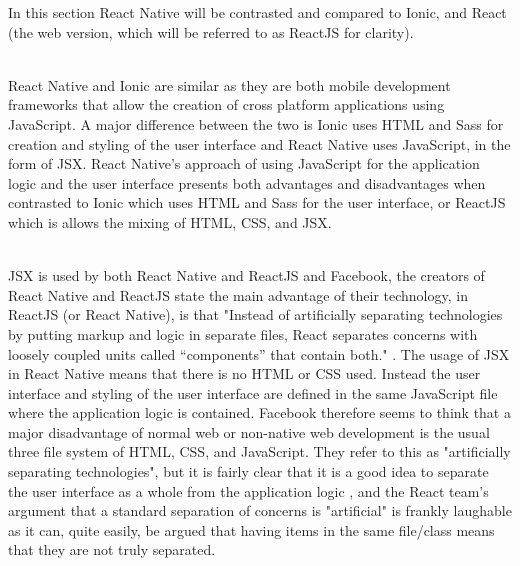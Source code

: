 \documentclass[a4paper, 11pt]{article}
\begin{document}
In this section React Native will be contrasted and compared to Ionic, and React (the web version, which will be referred to as ReactJS for clarity).

~\\
React Native and Ionic are similar as they are both mobile development frameworks that allow the creation of cross platform applications using JavaScript. A major difference between the two is Ionic uses HTML and Sass for creation and styling of the user interface and React Native uses JavaScript, in the form of JSX. React Native's approach of using JavaScript for the application logic and the user interface presents both advantages and disadvantages when contrasted to Ionic which uses HTML and 
Sass for the user interface, or ReactJS which is allows the mixing of HTML, CSS, and JSX.

~\\
JSX is used by both React Native and ReactJS and Facebook, the creators of React Native and ReactJS state the main advantage of their technology, in ReactJS (or React Native), is that "Instead of artificially separating technologies by putting markup and logic in separate files, React separates concerns with loosely coupled units called “components” that contain both." \cite{advantages}. The usage of JSX in React Native means that there is no HTML or CSS used. Instead the user interface and styling of the user interface are defined in the same JavaScript file where the application logic is contained. Facebook therefore seems to think that a major disadvantage of normal web or non-native web development is the usual three file system of HTML, CSS, and JavaScript. They refer to this as "artificially separating technologies", but it is fairly clear that it is a good idea to separate the user interface as a whole from the application logic \cite{sep}, and the React team's argument that a standard separation of concerns is "artificial" is frankly laughable as it can, quite easily, be argued that having items in the same file/class means that they are not truly separated.
\end{document}
